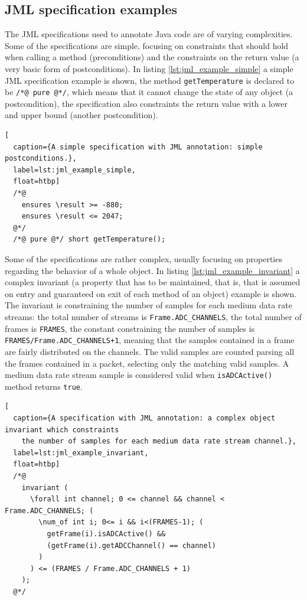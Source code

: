 \documentclass{article} \usepackage{times}
\newcommand{\lil}[1]{\texttt{\lstinline|#1|}}
\begin{document}
\subsection{JML specification examples}
\label{subsec:a_jml_specification_example}

The JML specifications used to annotate Java code are of varying
complexities.  Some of the specifications are simple, focusing on
constraints that should hold when calling a method (preconditions) and
the constraints on the return value (a very basic form of
postconditions).  In listing \ref{lst:jml_example_simple} a simple JML
specification example is shown, the method \lil{getTemperature} is
declared to be \lil{/*@ pure @*/}, which means that it cannot change
the state of any object (a postcondition), the specification also
constraints the return value with a lower and upper bound (another
postcondition).

\begin{lstlisting}[
  caption={A simple specification with JML annotation: simple postconditions.},
  label=lst:jml_example_simple,
  float=htbp]
  /*@ 
    ensures \result >= -880; 
    ensures \result <= 2047; 
  @*/ 
  /*@ pure @*/ short getTemperature();
\end{lstlisting}

\sloppy

Some of the specifications are rather complex, usually focusing on
properties regarding the behavior of a whole object.  In listing
\ref{lst:jml_example_invariant} a complex invariant (a property that
has to be maintained, that is, that is assumed on entry and guaranteed
on exit of each method of an object) example is shown.  The invariant
is constraining the number of samples for each medium data rate
streams: the total number of streams is \lil{Frame.ADC_CHANNELS}, the
total number of frames is \lil{FRAMES}, the constant constraining the
number of samples is \lil{FRAMES/Frame.ADC_CHANNELS+1}, meaning that
the samples contained in a frame are fairly distributed on the
channels.  The valid samples are counted parsing all the frames
contained in a packet, selecting only the matching valid samples.  A
medium data rate stream sample is considered valid when
\lil{isADCActive()} method returns \lil{true}.

\fussy

\begin{lstlisting}[
  caption={A specification with JML annotation: a complex object invariant which constraints 
    the number of samples for each medium data rate stream channel.},
  label=lst:jml_example_invariant,
  float=htbp]
  /*@ 
    invariant ( 
      \forall int channel; 0 <= channel && channel < Frame.ADC_CHANNELS; ( 
        \num_of int i; 0<= i && i<(FRAMES-1); (
          getFrame(i).isADCActive() && 
          (getFrame(i).getADCChannel() == channel) 
        ) 
      ) <= (FRAMES / Frame.ADC_CHANNELS + 1) 
    ); 
  @*/
\end{lstlisting}
\end{document}
